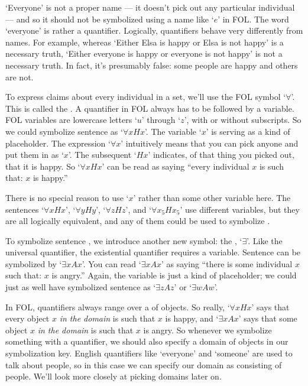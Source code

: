 `Everyone' is not a proper name --- it doesn't pick out any particular individual --- and so it should not be symbolized using a name like `$e$' in FOL.  The word `everyone' is rather a quantifier.  Logically, quantifiers behave very differently from names.  For example, whereas `Either Elsa is happy or Elsa is not happy' is a necessary truth, `Either everyone is happy or everyone is not happy' is not a necessary truth.  In fact, it's presumably false: some people are happy and others are not.

To express claims about every individual in a set, we'll use the FOL symbol `$\forall$'.  This is called the .  A quantifier in FOL always has to be followed by a variable. FOL variables are lowercase letters `$u$' through `$z$', with or without subscripts. So we could symbolize sentence  as `$\forall x Hx$'.  The variable `$x$' is serving as a kind of placeholder. The expression `$\forall x$' intuitively means that you can pick anyone and put them in as `$x$'. The subsequent `$Hx$' indicates, of that thing you picked out, that it is happy.  So `$\forall x Hx$' can be read as saying ``every individual $x$ is such that: $x$ is happy.''

There is no special reason to use `$x$' rather than some other variable here. The sentences `$\forall x Hx$', `$\forall y Hy$', `$\forall z Hz$', and `$\forall x_5 Hx_5$' use different variables, but they are all logically equivalent, and any of them could be used to symbolize .

To symbolize sentence , we introduce another new symbol: the , `$\exists$'. Like the universal quantifier, the existential quantifier requires a variable. Sentence  can be symbolized by `$\exists x Ax$'. You can read `$\exists x Ax$' as saying ``there is some individual $x$ such that: $x$ is angry.'' Again, the variable is just a kind of placeholder; we could just as well have symbolized sentence  as `$\exists z Az$' or `$\exists w Aw$'.

In FOL, quantifiers always range over a  of objects.  So really, `$\forall xHx$' says that every object $x$ \emph{in the domain} is such that $x$ is happy, and `$\exists xAx$' says that some object $x$ \emph{in the domain} is such that $x$ is angry.  So whenever we symbolize something with a quantifier, we should also specify a domain of objects in our symbolization key.  English quantifiers like `everyone' and `someone' are used to talk about people, so in this case we can specify our domain as consisting of people.  We'll look more closely at picking domains later on.




